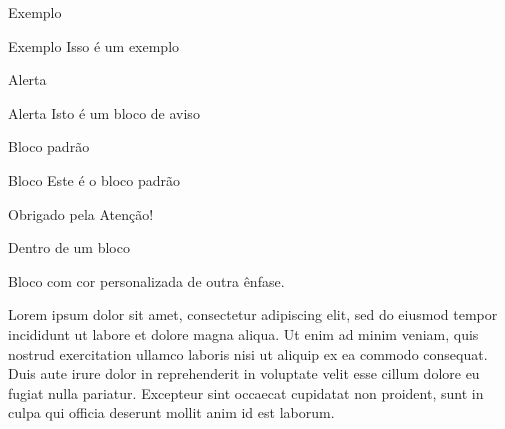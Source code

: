 \documentclass[aspectratio=169]{beamer}
\begin{document}
\begin{frame}{Exemplo}

\begin{exampleblock}{Exemplo}
    Isso é um exemplo
\end{exampleblock}
    
\end{frame}

\begin{frame}{Alerta}

\begin{alertblock}{Alerta}
    Isto é um bloco de aviso
\end{alertblock}
    
\end{frame}

\begin{frame}{Bloco padrão}

\begin{block}{Bloco}
    Este é o bloco padrão
\end{block}
    
\end{frame}

\begin{frame}[standout]
  Obrigado pela Atenção!
\end{frame}

\begin{frame}[standout]
  \begin{standoutbox}
    Dentro de um bloco
  \end{standoutbox}
\end{frame}

\begin{frame}[standout]
  \begin{standoutbox}[matematica300]
    Bloco com cor personalizada de outra ênfase.
  \end{standoutbox}
\end{frame}

\begin{frame}[standout]
  \begin{standoutbox}[computacao300]
    Lorem ipsum dolor sit amet, consectetur adipiscing elit, sed do eiusmod tempor incididunt ut labore et dolore magna aliqua. Ut enim ad minim veniam, quis nostrud exercitation ullamco laboris nisi ut aliquip ex ea commodo consequat. Duis aute irure dolor in reprehenderit in voluptate velit esse cillum dolore eu fugiat nulla pariatur. Excepteur sint occaecat cupidatat non proident, sunt in culpa qui officia deserunt mollit anim id est laborum.
  \end{standoutbox}
\end{frame}
\end{document}
